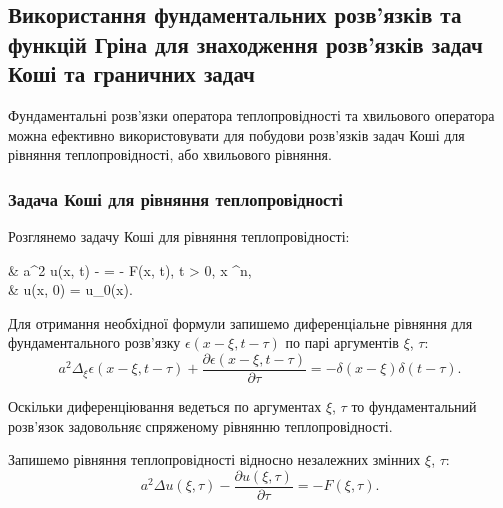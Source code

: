 \subsection{Використання фундаментальних розв'язків та \allowbreak функцій Гріна для знаходження розв'язків задач Коші та граничних задач}

Фундаментальні розв'язки оператора теплопровідності та хвильового оператора можна ефективно використовувати для побудови розв'язків задач Коші для рівняння теплопровідності, або хвильового рівняння.

\subsubsection{Задача Коші для рівняння теплопровідності}

\begin{example}
	Розглянемо задачу Коші для рівняння теплопровідності:
	\begin{system}
		& a^2 \Delta u(x, t) -  = - F(x, t), \quad t > 0, \quad x \in \RR^n, \\
		& u(x, 0) = u_0(x).
	\end{system}
\end{example}

Для отримання необхідної формули запишемо диференціальне рівняння для фундаментального розв'язку $\epsilon(x - \xi, t - \tau)$ по парі аргументів $\xi$, $\tau$:
\begin{equation}
	\label{eq:3.3.2}
	a^2 \Delta_\xi \epsilon(x - \xi, t - \tau) + \frac{\partial \epsilon(x - \xi, t - \tau)}{\partial \tau} = - \delta(x - \xi) \delta(t - \tau).
\end{equation}

\begin{remark}
	Оскільки диференціювання ведеться по аргументах $\xi$, $\tau$ то фундаментальний розв'язок задовольняє спряженому рівнянню теплопровідності.
\end{remark}

Запишемо рівняння теплопровідності відносно незалежних змінних $\xi$, $\tau$:
\begin{equation}
	a^2 \Delta u(\xi, \tau) - \frac{\partial u(\xi, \tau)}{\partial \tau} = - F(\xi, \tau).
\end{equation}


